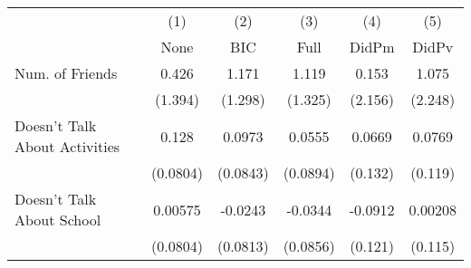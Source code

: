 {
\def\sym#1{\ifmmode^{#1}\else\(^{#1}\)\fi}
\begin{tabular}{l*{5}{c}}
\toprule
            &\multicolumn{1}{c}{(1)}&\multicolumn{1}{c}{(2)}&\multicolumn{1}{c}{(3)}&\multicolumn{1}{c}{(4)}&\multicolumn{1}{c}{(5)}\\
            &\multicolumn{1}{c}{None}&\multicolumn{1}{c}{BIC}&\multicolumn{1}{c}{Full}&\multicolumn{1}{c}{DidPm}&\multicolumn{1}{c}{DidPv}\\
\midrule
Num. of Friends&       0.426         &       1.171         &       1.119         &       0.153         &       1.075         \\
            &     (1.394)         &     (1.298)         &     (1.325)         &     (2.156)         &     (2.248)         \\
\addlinespace
Doesn't Talk About Activities&       0.128         &      0.0973         &      0.0555         &      0.0669         &      0.0769         \\
            &    (0.0804)         &    (0.0843)         &    (0.0894)         &     (0.132)         &     (0.119)         \\
\addlinespace
Doesn't Talk About School&     0.00575         &     -0.0243         &     -0.0344         &     -0.0912         &     0.00208         \\
            &    (0.0804)         &    (0.0813)         &    (0.0856)         &     (0.121)         &     (0.115)         \\
\bottomrule
\end{tabular}
}
